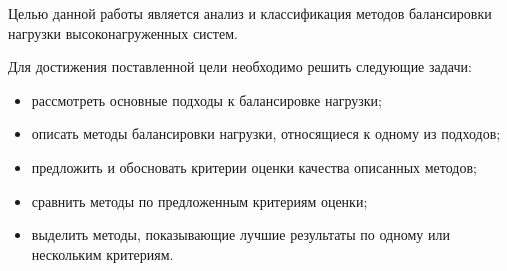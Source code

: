 Целью данной работы является анализ и классификация методов балансировки нагрузки высоконагруженных систем.

Для достижения поставленной цели необходимо решить следующие задачи:
\begin{itemize}
    \item рассмотреть основные подходы к балансировке нагрузки;
    \item описать методы балансировки нагрузки, относящиеся к одному из подходов;
    \item предложить и обосновать критерии оценки качества описанных методов;
    \item сравнить методы по предложенным критериям оценки;
    \item выделить методы, показывающие лучшие результаты по одному или нескольким критериям.
\end{itemize}
